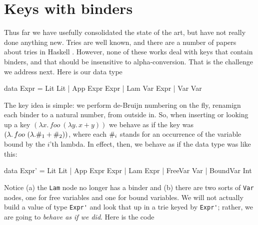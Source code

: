 \documentclass[acmsmall]{acmart}
\theoremstyle{theorem}
\theoremstyle{definition}
\theoremstyle{remark}
\begin{document}
\section{Keys with binders} \label{sec:binders}

Thus far we have usefully consolidated the state of the art, but have not really done
anything new.  Tries are well known, and there are a number of papers about
tries in Haskell \cite{hinze etc}.  However, none of these works deal with keys that contain
binders, and that should be insensitive to alpha-conversion.  That is the challenge we
address next.  Here is our data type
\begin{code}
data Expr = Lit Lit | App Expr Expr | Lam Var Expr | Var Var
\end{code}
The key idea is simple: we perform de-Bruijn numbering on the fly,
renamign each binder to a natural number, from outside in.
So, when inserting or looking up a key $(\lambda x.\, foo~ (\lambda y.\, x+y))$ we
behave as if the key was $(\lambda.\, foo ~(\lambda. \#_{1} + \#_{2}))$, where
each $\#_{i}$ stands for an occurrence of the variable bound by the $i$'th lambda.
In effect, then, we behave as if the data type was like this:
\begin{code}
data Expr' = Lit Lit | App Expr Expr | Lam Expr | FreeVar Var | BoundVar Int
\end{code}
Notice (a) the \lstinline{Lam} node no longer has a binder and (b) there are
two sorts of \lstinline{Var} nodes, one for free variables and one for bound
variables. We will not actually build a value of type \lstinline{Expr'} and look
that up in a trie keyed by \lstinline{Expr'}; rather,
we are going to \emph{behave as if we did}. Here is the code
\end{document}
